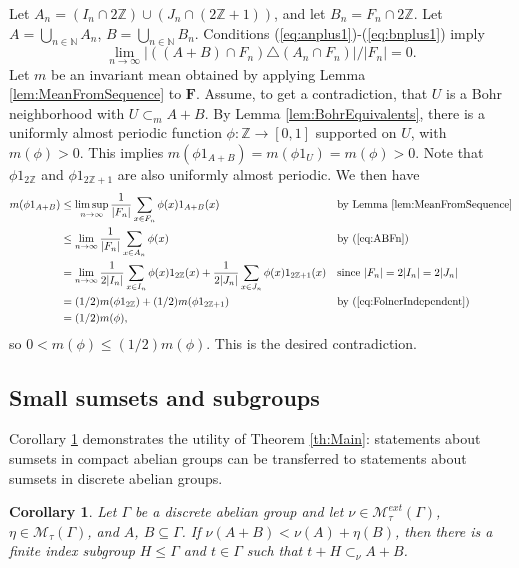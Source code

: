\documentclass[12pt]{amsart} \usepackage{amsmath,centernot,amssymb,leftindex}
\newcommand{\mb}{\mathbf}
\newtheorem{corollary}[theorem]{Corollary}
\numberwithin{theorem}{section}
\numberwithin{equation}{section}
\theoremstyle{definition}
\begin{document}
	Let $A_{n}=(I_{n}\cap 2\mathbb Z)\cup (J_{n}\cap (2\mathbb Z+1))$, and let $B_{n}=F_{n}\cap 2\mathbb Z$.  Let $A=\bigcup_{n\in \mathbb N} A_{n}$, $B=\bigcup_{n\in \mathbb N} B_{n}$.   Conditions (\ref{eq:anplus1})-(\ref{eq:bnplus1}) imply
	\begin{equation}\label{eq:ABFn}\lim_{n\to\infty} |((A+B)\cap F_{n}) \triangle (A_{n}\cap F_{n})|/|F_{n}|=0.
		\end{equation}
	Let $m$ be an invariant mean obtained by applying Lemma \ref{lem:MeanFromSequence} to $\mb F$. Assume, to get a contradiction, that $U$ is a Bohr neighborhood with $U\subset_{m} A+B$.  By Lemma \ref{lem:BohrEquivalents}, there is a uniformly almost periodic function $\phi: \mathbb Z\to [0,1]$ supported on $U$, with $m(\phi)>0$.  This implies $m(\phi 1_{A+B})=m(\phi 1_{U})=m(\phi)>0$.  Note that $\phi1_{2\mathbb Z}$ and $\phi 1_{2\mathbb Z+1}$ are also uniformly almost periodic. We then have
	\begin{align*}
		m(\phi 1_{A+B})&\leq \limsup_{n\to\infty} \frac{1}{|F_{n}|}\sum_{x\in F_{n}} \phi(x)1_{A+B}(x)  && \text{by Lemma \ref{lem:MeanFromSequence}}\\
		&\leq \lim_{n\to\infty} \frac{1}{|F_{n}|}\sum_{x\in A_{n}} \phi(x)  && \text{by (\ref{eq:ABFn})}\\
		&=\lim_{n\to\infty} \frac{1}{2|I_{n}|}\sum_{x\in I_{n}}\phi(x)1_{2\mathbb Z}(x) +  \frac{1}{2|J_{n}|}\sum_{x\in J_{n}}\phi(x)1_{2\mathbb Z+1}(x)  && \text{since }|F_{n}|=2|I_{n}|=2|J_{n}|\\
		&= (1/2)m(\phi1_{2\mathbb Z})+(1/2)m(\phi 1_{2\mathbb Z+1})  && \text{by (\ref{eq:FolnerIndependent})}\\
		&= (1/2)m(\phi),
	\end{align*}
	so $0<m(\phi)\leq  (1/2)m(\phi)$. This is the desired contradiction.

	
	
\subsection{Small sumsets and subgroups}

Corollary \ref{cor:FiniteIndex} demonstrates the utility of Theorem \ref{th:Main}: statements about sumsets in compact abelian groups can be transferred to statements about sumsets in discrete abelian groups.

\begin{corollary}\label{cor:FiniteIndex}
	Let $\Gamma$ be a discrete abelian group and let $\nu\in \mathcal M_{\tau}^{ext}(\Gamma)$,  $\eta\in \mathcal M_{\tau}(\Gamma)$,	and 
$A$, $B\subseteq \Gamma$. If  $\nu(A+B)<\nu(A)+\eta(B)$, then there is a finite index subgroup $H\leq \Gamma$ and $t\in \Gamma$ such that $t+H\subset_{\nu} A+B$.
\end{corollary}
\end{document}
